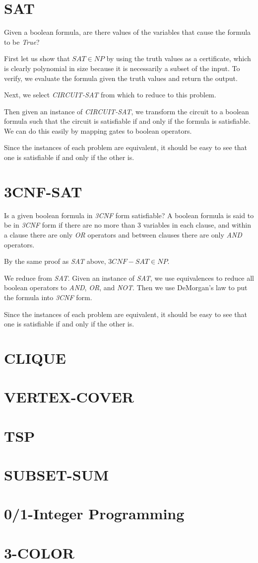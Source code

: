 \section{SAT}

Given a boolean formula, are there values of the variables that cause
the formula to be \emph{True}?

First let us show that $SAT \in NP$ by using the truth values as a
certificate, which is clearly polynomial in size because it is
necessarily a subset of the input.  To verify, we evaluate the formula
given the truth values and return the output.

Next, we select \emph{CIRCUIT-SAT} from which to reduce to this
problem.

Then given an instance of \emph{CIRCUIT-SAT}, we transform the circuit
to a boolean formula such that the circuit is satisfiable if and only
if the formula is satisfiable.  We can do this easily by mapping gates
to boolean operators.

Since the instances of each problem are equivalent, it should be easy
to see that one is satisfiable if and only if the other is.

\section{3CNF-SAT}

Is a given boolean formula in \emph{3CNF} form satisfiable?  A boolean
formula is said to be in \emph{3CNF} form if there are no more than
$3$ variables in each clause, and within a clause there are only
\emph{OR} operators and between clauses there are only \emph{AND}
operators.

By the same proof as \emph{SAT} above, $3CNF-SAT \in NP$.

We reduce from \emph{SAT}.  Given an instance of \emph{SAT}, we use
equivalences to reduce all boolean operators to \emph{AND}, \emph{OR},
and \emph{NOT}.  Then we use DeMorgan's law to put the formula into
\emph{3CNF} form.

Since the instances of each problem are equivalent, it should be easy
to see that one is satisfiable if and only if the other is.

\section{CLIQUE}

\section{VERTEX-COVER}

\section{TSP}

\section{SUBSET-SUM}

\section{0/1-Integer Programming}

\section{3-COLOR}

